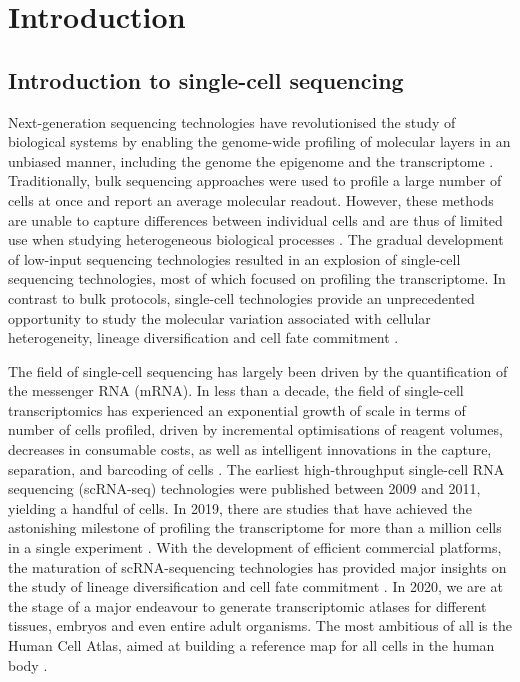 \graphicspath{{Introduction/Figs/}}

\chapter{Introduction}

\section{Introduction to single-cell sequencing}

Next-generation sequencing technologies have revolutionised the study of biological systems by enabling the genome-wide profiling of molecular layers in an unbiased manner, including the genome \cite{Fleischmann1995} the epigenome \cite{Frommer1992} and the transcriptome \cite{Lister2008,Bainbridge2006,Nagalakshmi2008,Mortazavi2008}. Traditionally, bulk sequencing approaches were used to profile a large number of cells at once and report an average molecular readout. However, these methods are unable to capture differences between individual cells and are thus of limited use when studying heterogeneous biological processes \cite{Griffiths2018,Papalexi2017,Patel2014}. The gradual development of low-input sequencing technologies resulted in an explosion of single-cell sequencing technologies, most of which focused on profiling the transcriptome. In contrast to bulk protocols, single-cell technologies provide an unprecedented opportunity to study the molecular variation associated with cellular heterogeneity, lineage diversification and cell fate commitment \cite{Kolodziejczyk2015}.

The field of single-cell sequencing has largely been driven by the quantification of the messenger RNA (mRNA). In less than a decade, the field of single-cell transcriptomics has experienced an exponential growth of scale in terms of number of cells profiled, driven by incremental optimisations of reagent volumes, decreases in consumable costs, as well as intelligent innovations in the capture, separation, and barcoding of cells \cite{Svensson2018}. The earliest high-throughput single-cell RNA sequencing (scRNA-seq) technologies were published between 2009 and 2011, yielding a handful of cells. In 2019, there are studies that have achieved the astonishing milestone of profiling the transcriptome for more than a million cells in a single experiment \cite{Cao2019}. With the development of efficient commercial platforms, the maturation of scRNA-sequencing technologies has provided major insights on the study of lineage diversification and cell fate commitment \cite{Kolodziejczyk2015,Griffiths2018,Papalexi2017,Patel2014}. In 2020, we are at the stage of a major endeavour to generate transcriptomic atlases for different tissues, embryos and even entire adult organisms. The most ambitious of all is the Human Cell Atlas, aimed at building a reference map for all cells in the human body \cite{Aviv2017}.

